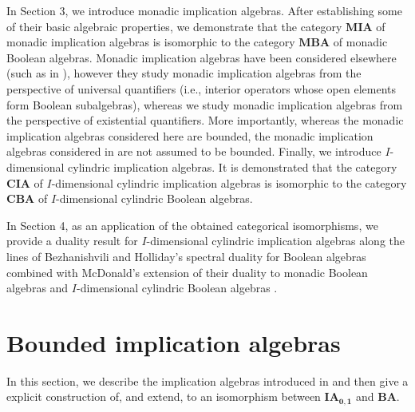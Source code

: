 \documentclass[reqno]{amsart}
\theoremstyle{plain}
\theoremstyle{definition}
\begin{document}
In Section 3, we introduce monadic implication algebras. After establishing some of their basic algebraic properties, we demonstrate that the category $\mathbf{MIA}$ of monadic implication algebras is isomorphic to the category $\mathbf{MBA}$ of monadic Boolean algebras. Monadic implication algebras have been considered elsewhere (such as in \cite{abad}), however they study monadic implication algebras from the perspective of universal quantifiers (i.e., interior operators whose open elements form  Boolean subalgebras), whereas we study monadic implication algebras from the perspective of existential quantifiers. More importantly, whereas the monadic implication algebras considered here are bounded, the monadic implication algebras considered in \cite{abad} are not assumed to be bounded. Finally, we introduce $I$-dimensional cylindric implication algebras. It is demonstrated that the category $\mathbf{CIA}$ of $I$-dimensional cylindric implication algebras is isomorphic to the category $\mathbf{CBA}$ of $I$-dimensional cylindric Boolean algebras.

In Section 4, as an application of the obtained categorical isomorphisms, we provide a duality result for $I$-dimensional cylindric implication algebras along the lines of Bezhanishvili and Holliday's spectral duality for Boolean algebras \cite{bez} combined with McDonald's extension of their duality to monadic Boolean algebras and $I$-dimensional cylindric Boolean algebras \cite{mcdonald2}.         

\section{Bounded implication algebras}
In this section, we describe the implication algebras introduced in \cite{abbott672} and then give a explicit construction of, and extend, \cite[Theorem 19]{abbott672} to an isomorphism between $\mathbf{IA_{0,1}}$ and $\mathbf{BA}$. 
\end{document}
